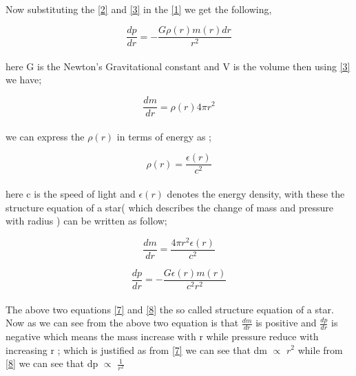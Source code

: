 \documentclass{report}
\begin{document}
\paragraph{ }
Now substituting the \ref{2} and \ref{3} in the \ref{1} we get the following,
\begin{center}
\begin{equation}
\frac{dp}{dr} = -\frac{G\rho(r)m(r)dr}{r^2}
\label{4}
\end{equation}
\end{center}
\paragraph{ }
here G is the Newton's Gravitational constant and V is the volume then using \ref{3} we have;
\begin{center}
\begin{equation}
\frac{dm}{dr} = \rho(r)4\pi r^2
\label{5}
\end{equation}
\end{center}
\paragraph{ }
we can express the $\rho(r)$ in terms of energy as ;
\begin{center}
\begin{equation}
\rho(r) = \frac{\epsilon(r)}{c^2}
\label{6}
\end{equation}
\end{center}
\paragraph{}
here c is the speed of light and $\epsilon(r)$ denotes the energy density, with these the structure equation of a star( which describes the change of mass and pressure with radius ) can be written as follow;
\begin{center}
\begin{equation}
\frac{dm}{dr} = \frac{4\pi r^2\epsilon(r)}{c^2}
\label{7}
\end{equation}
\end{center}
\begin{center}
\begin{equation}
\frac{dp}{dr} = -\frac{G\epsilon(r)m(r)}{c^2 r^2}
\label{8}
\end{equation}
\end{center} 
\paragraph{ }
The above two equations \ref{7} and \ref{8} the so called structure equation of a star. Now as we can see from the above two equation is that $\frac{dm}{dr}$  is positive and $\frac{dp}{dr}$ is negative which means the mass increase with r while pressure reduce with increasing r ; which is justified as from \ref{7} we can see that dm $\propto$ $r^2$ while from \ref{8} we can see that dp $\propto$ $\frac{1}{r^2}$ 
\end{document}
